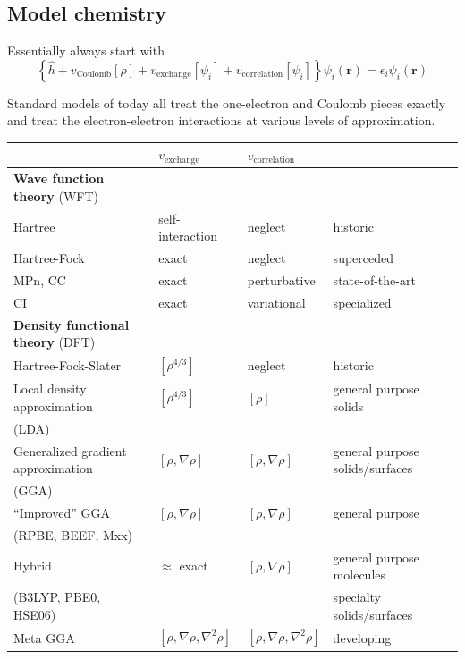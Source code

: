 \documentclass[11pt]{article}
\begin{document}
\subsection{Model chemistry}
\label{sec:orgb497968}
Essentially always start with
\begin{equation}
\left \{ \hat{h} +v_{\text{Coulomb}}[\rho] + v_\text{exchange}[\psi_{i}] + v_\text{correlation}[\psi_{i}]\right\}\psi_i(\mathbf{r}) =\epsilon_i \psi_i(\mathbf{r})
\end{equation} 
\label{fock}

Standard models of today all treat the one-electron and Coulomb pieces exactly and treat
the electron-electron interactions at various levels of approximation.
\begin{center}
\begin{tabular}{llll}
\hline
 & \(v_{\text{exchange}}\) & \(v_{\text{correlation}}\) & \\
\hline
\textbf{Wave function theory} (WFT) &  &  & \\
Hartree & self-interaction & neglect & historic\\
Hartree-Fock & exact & neglect & superceded\\
MPn, CC & exact & perturbative & state-of-the-art\\
CI & exact & variational & specialized\\
\hline
\textbf{Density functional theory} (DFT) &  &  & \\
Hartree-Fock-Slater & \([\rho^{{4/3}}]\) & neglect & historic\\
Local density approximation & \([\rho^{{4/3}}]\) & \([\rho]\) & general purpose solids\\
(LDA) &  &  & \\
Generalized gradient approximation & \([\rho,\nabla\rho]\) & \([\rho,\nabla\rho]\) & general purpose solids/surfaces\\
(GGA) &  &  & \\
``Improved'' GGA & \([\rho,\nabla\rho]\) & \([\rho,\nabla\rho]\) & general purpose\\
(RPBE, BEEF, Mxx) &  &  & \\
Hybrid & \(\approx\) exact & \([\rho,\nabla\rho]\) & general purpose molecules\\
(B3LYP, PBE0, HSE06) &  &  & specialty solids/surfaces\\
Meta GGA & \([\rho,\nabla\rho,\nabla^2\rho]\) & \([\rho,\nabla\rho,\nabla^2\rho]\) & developing\\
\hline
\end{tabular}
\end{center}
\end{document}
